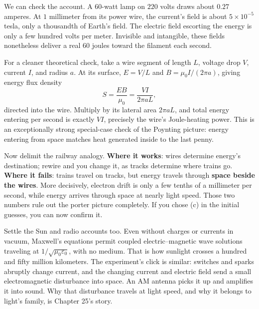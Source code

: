 We can check the account. A \(60\)-watt lamp on \(220\) volts draws about \(0.27\) amperes. At \(1\) millimeter from its power wire, the current's field is about \(5\times10^{-5}\) tesla, only a thousandth of Earth's field. The electric field escorting the energy is only a few hundred volts per meter. Invisible and intangible, these fields nonetheless deliver a real \(60\) joules toward the filament each second.

For a cleaner theoretical check, take a wire segment of length \(L\), voltage drop \(V\), current \(I\), and radius \(a\). At its surface, \(E=V/L\) and \(B=\mu_0 I/(2\pi a)\), giving energy flux density
\[
S=\frac{EB}{\mu_0}=\frac{VI}{2\pi aL},
\]
directed into the wire. Multiply by its lateral area \(2\pi aL\), and total energy entering per second is exactly \(VI\), precisely the wire's Joule-heating power. This is an exceptionally strong special-case check of the Poynting picture: energy entering from space matches heat generated inside to the last penny.

Now delimit the railway analogy. \textbf{Where it works}: wires determine energy's destination; rewire and you change it, as tracks determine where trains go. \textbf{Where it fails}: trains travel on tracks, but energy travels through \textbf{space beside the wires}. More decisively, electron drift is only a few tenths of a millimeter per second, while energy arrives through space at nearly light speed. Those two numbers rule out the porter picture completely. If you chose (c) in the initial guesses, you can now confirm it.

Settle the Sun and radio accounts too. Even without charges or currents in vacuum, Maxwell's equations permit coupled electric--magnetic wave solutions traveling at \(1/\sqrt{\mu_0\varepsilon_0}\), with no medium. That is how sunlight crosses a hundred and fifty million kilometers. The experiment's click is similar: switches and sparks abruptly change current, and the changing current and electric field send a small electromagnetic disturbance into space. An AM antenna picks it up and amplifies it into sound. Why that disturbance travels at light speed, and why it belongs to light's family, is Chapter 25's story.


